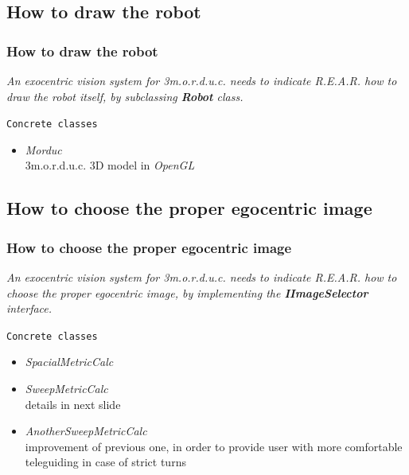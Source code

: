 \subsection{How to draw the robot}
\frame
{
  \frametitle{How to draw the robot}
  
  \emph{An exocentric vision system for \textit{3m.o.r.d.u.c.} 
    needs to indicate \textit{R.E.A.R.} how to draw the robot itself,
    by subclassing \textbf{Robot} class.}
  \pause

  \vskip15pt

  \begin{block} {\alert{\texttt{Concrete classes}}}

    \pause
    \begin{itemize}
      
    \item \alert{\textit{Morduc}} \\
      3m.o.r.d.u.c. 3D model in \textit{OpenGL}
    \end{itemize}

  \end{block}
}

\subsection{How to choose the proper egocentric image}
\frame
{
  \frametitle{How to choose the proper egocentric image}
  
  \emph{An exocentric vision system for \textit{3m.o.r.d.u.c.} 
    needs to indicate \textit{R.E.A.R.} how to choose the proper egocentric image,
    by implementing the \textbf{IImageSelector} interface.}
  \pause

  \vskip15pt

  \begin{block} {\alert{\texttt{Concrete classes}}}

    \begin{itemize}
      
    \pause
    \item \alert{\textit{SpacialMetricCalc}}
    \pause
    \item \alert{\textit{SweepMetricCalc}} \\
      details in next slide
    \pause
    \item \alert{\textit{AnotherSweepMetricCalc}} \\
      improvement of previous one, in order to
      provide user with more comfortable teleguiding
      in case of strict turns

    \end{itemize}

  \end{block}
}

